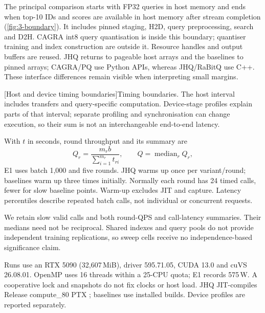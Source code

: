 The principal comparison starts with FP32 queries in host memory and ends
when top-10 IDs and scores are available in host memory after stream
completion (\cref{fig:3-boundary}). It includes pinned staging, H2D,
query preprocessing, search and D2H. CAGRA int8 query quantisation is inside
this boundary; quantiser training and index construction are outside it.
Resource handles and output buffers are reused. JHQ returns to pageable
host arrays and the baselines to pinned arrays; CAGRA/PQ use Python APIs,
whereas JHQ/RaBitQ use C++. These interface differences remain visible when
interpreting small margins.

\par\medskip\noindent\begin{minipage}{\linewidth}
\centering\captionsetup{hypcap=false}
\resizebox{\linewidth}{!}{}
[Host and device timing boundaries]{Timing boundaries. The host interval includes transfers and
query-specific computation. Device-stage profiles explain parts of that
interval; separate profiling and synchronisation can change execution, so
their sum is not an interchangeable end-to-end latency.}
\label{fig:3-boundary}
\end{minipage}\par\medskip

With $t$ in seconds, round throughput and its summary are
\begin{equation}
Q_r=\frac{m_rb}{\sum_{i=1}^{m_r}t_{ri}},\qquad
Q=\operatorname{median}_r Q_r,
\label{eq:3-throughput}
\end{equation}
E1 uses batch 1,000 and five rounds. JHQ warms up once per variant/round; baselines warm up three times initially. Normally each round has 24 timed calls, fewer for slow baseline points. Warm-up excludes JIT and capture. Latency percentiles describe repeated batch calls, not individual or concurrent requests.

We retain slow valid calls and both round-QPS and call-latency summaries. Their medians need not be reciprocal. Shared indexes and query pools do not provide independent training replications, so sweep cells receive no independence-based significance claim.

Runs use an RTX 5090 (32,607\,MiB), driver 595.71.05, CUDA 13.0 and cuVS 26.08.01. OpenMP uses 16 threads within a 25-CPU quota; E1 records 575\,W. A cooperative lock and snapshots do not fix clocks or host load. JHQ JIT-compiles Release compute\_80 PTX \cite{cuda_platform}; baselines use installed builds. Device profiles are reported separately.


